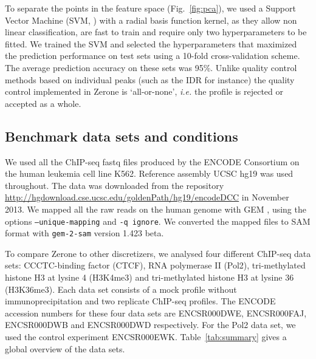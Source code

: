 \documentclass{bioinfo}
\begin{document}
\begin{methods}
To separate the points in the feature space (Fig.~\ref{fig:pca}),
we used a Support Vector Machine (SVM, \citealp{Chang2011,e1071})
with a radial basis function kernel,
as they allow non linear classification, are fast to train and
require only two hyperparameters to be fitted.
We trained the SVM and
selected the hyperparameters that maximized the prediction
performance on test sets using a 10-fold cross-validation scheme.
The average prediction accuracy on these sets was 95\%. Unlike
quality control methods based on individual peaks (such as the
IDR for instance) the quality control implemented in Zerone is
`all-or-none', \textit{i.e.} the profile is rejected or accepted
as a whole.

\subsection{Benchmark data sets and conditions}
\label{sub:bench_cond}
We used all the ChIP-seq fastq files produced by the ENCODE Consortium
on the human leukemia cell line K562. Reference assembly UCSC hg19 was
used throughout. The data was downloaded from the repository
\href{http://hgdownload.cse.ucsc.edu/goldenPath/hg19/encodeDCC}{http://hgdownload.cse.ucsc.edu/goldenPath/hg19/encodeDCC} in November 2013.
We mapped all the raw reads on the human genome with
GEM \citep[\texttt{gem-mapper} version 1.376 beta, \texttt{gem-indexer} version
1.423 beta,][]{pmid23103880}, using the options \texttt{--unique-mapping} and
\texttt{-q ignore}. We converted the mapped files to SAM format with
\texttt{gem-2-sam} version 1.423 beta.

To compare Zerone to other discretizers, we analysed four different
ChIP-seq data sets: CCCTC-binding factor (CTCF), RNA polymerase II
(Pol2), tri-methylated histone H3 at lysine 4 (H3K4me3)
and tri-methylated histone H3 at lysine 36 (H3K36me3).
Each data set consists of a mock profile without immunoprecipitation
and two replicate ChIP-seq profiles.
The ENCODE accession numbers for these four data sets are
ENCSR000DWE, ENCSR000FAJ, ENCSR000DWB and ENCSR000DWD respectively.
For the Pol2 data set, we used the control experiment ENCSR000EWK.
Table~\ref{tab:summary} gives a global overview of the data sets.


\end{methods}
\end{document}
